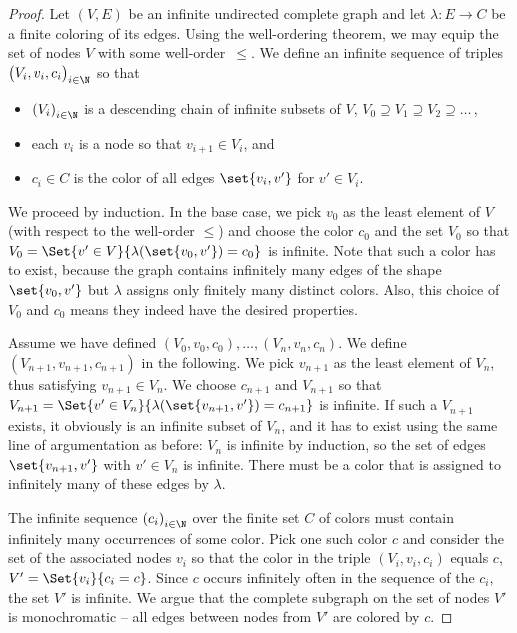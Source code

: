 \documentclass[../../diss.tex]{subfiles}
\begin{document}
\begin{proof}
    Let $(V,E)$ be an infinite undirected complete graph and let $\lambda \colon E \to C$ be a finite coloring of its edges.
    Using the well-ordering theorem, we may equip the set of nodes $V$ with some well-order~$\leq$.
    We define an infinite sequence of triples ${\big( V_i,v_i,c_i \big)}_{i \in \N}$ so that
    \begin{itemize}
        \item
            ${(V_i)}_{i \in \N}$ is a descending chain of infinite subsets of $V$, \ie
            $V_0 \supseteq V_1 \supseteq V_2 \supseteq \ldots \,$,
        \item
            each $v_i$ is a node so that $v_{i+1} \in V_i$, and
        \item
            $c_i \in C$ is the color of all edges $\set{v_i,v'}$ for $v' \in V_i$.
    \end{itemize}
    We proceed by induction.
    In the base case, we pick $v_0$ as the least element of $V$ (with respect to the well-order $\leq$) and choose the color $c_0$ and the set $V_0$ so that $V_0 = \Set{ v' \in V }{\lambda(\set{v_0,v'}) = c_0 }$ is infinite.
    Note that such a color has to exist, because the graph contains infinitely many edges of the shape $\set{v_0,v'}$ but $\lambda$ assigns only finitely many distinct colors.
    Also, this choice of $V_0$ and $c_0$ means they indeed have the desired properties.

    Assume we have defined $(V_0,v_0,c_0), \ldots, (V_n,v_n,c_n)$.
    We define $(V_{n+1},v_{n+1},c_{n+1})$ in the following.
    We pick $v_{n+1}$ as the least element of $V_n$, thus satisfying $v_{n+1} \in V_n$.
    We choose $c_{n+1}$ and $V_{n+1}$ so that $V_{n+1} = \Set{ v' \in V_{n} }{\lambda(\set{v_{n+1},v'}) = c_{n+1} }$ is infinite.
    If such a $V_{n+1}$ exists, it obviously is an infinite subset of $V_n$, and it has to exist using the same line of argumentation as before:
    $V_n$ is infinite by induction, so the set of edges $\set{v_{n+1},v'}$ with $v' \in V_n$ is infinite.
    There must be a color that is assigned to infinitely many of these edges by $\lambda$.

    The infinite sequence ${(c_i)}_{i \in \N}$ over the finite set $C$ of colors must contain infinitely many occurrences of some color.
    Pick one such color $c$ and consider the set of the associated nodes $v_i$ so that the color in the triple $(V_i,v_i,c_i)$ equals $c$, $V' = \Set{ v_i }{ c_i = c}$.
    Since $c$ occurs infinitely often in the sequence of the $c_i$, the set $V'$ is infinite.
    We argue that the complete subgraph on the set of nodes $V'$ is monochromatic -- all edges between nodes from $V'$ are colored by $c$.


\end{proof}
\end{document}

